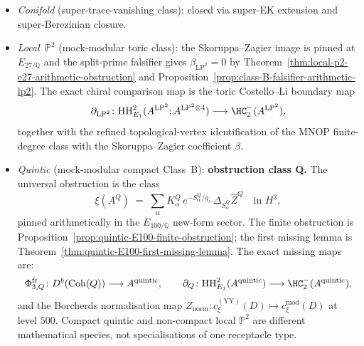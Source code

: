 \begin{remark}
\begin{itemize}
\item \emph{Conifold} (super-trace-vanishing class): closed via
 super-EK extension and super-Berezinian closure.
\item \emph{Local~$\mathbb{P}^2$} (mock-modular toric class):
 the
 Skoruppa--Zagier image is pinned at
 $E_{27/\mathbb{Q}}$ and the split-prime falsifier gives
 $\beta_{\mathrm{LP}^2}=0$ by
 Theorem~\ref{thm:local-p2-e27-arithmetic-obstruction} and
 Proposition~\ref{prop:class-B-falsifier-arithmetic-lp2}.
 The exact chiral comparison map is the toric Costello--Li
 boundary map
 \[
 \partial_{\mathrm{LP}^2}\colon
 \HH^2_{E_1}(A^{\mathrm{LP}^2};
 A^{\mathrm{LP}^2\otimes 4})
 \longrightarrow
 \HC_2^-(A^{\mathrm{LP}^2}),
 \]
 together with the refined topological-vertex identification of
 the MNOP finite-degree class with the Skoruppa--Zagier
 coefficient $\beta$.
\item \emph{Quintic} (mock-modular compact Class~B):
 \textbf{obstruction class \textup{Q}.} The universal
 obstruction is the class
 \[
 \xi(A^Q) \;=\; \sum_\alpha K_\alpha^Q \,e^{-S_\alpha^Q / g_s}
 \,\Delta_{S_\alpha^Q} \widehat{Z}^Q
 \quad\text{in } H^2,
 \]
 pinned arithmetically in the
 $E_{100/\mathbb{Q}}$ new-form sector. The finite obstruction is
 Proposition~\ref{prop:quintic-E100-finite-obstruction};
 the first missing lemma is
 Theorem~\ref{thm:quintic-E100-first-missing-lemma}. The exact
 missing maps are:
 \[
 \Phi_{3,Q}^{\mathrm{fr}}\colon D^b(\Coh(Q))
 \longrightarrow A^{\mathrm{quintic}},\qquad
 \partial_Q\colon \HH^2_{E_1}(A^{\mathrm{quintic}})
 \longrightarrow \HC^-_2(A^{\mathrm{quintic}}),
 \]
 and the Borcherds normalisation map
 $Z_{\mathrm{norm}}\colon c_{\xi}^{(\mathrm{YY})}(D)\mapsto
 c_{\xi}^{\mathrm{mod}}(D)$ at level $500$. Compact quintic and
 non-compact local $\mathbb{P}^2$ are different mathematical
 species, not specialisations of one receptacle type.
\end{itemize}
\end{remark}

